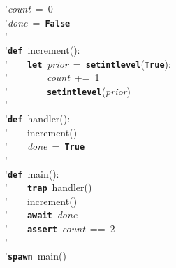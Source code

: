 \'\>\textit{count}~=~0\\

\'\>\textit{done}~=~\texttt{\textbf{False}}\\

\'\>\\

\'\>\texttt{\textbf{def}}~increment():\\

\'\>~~~~\texttt{\textbf{let}}~\textit{prior}~=~\texttt{\textbf{setintlevel}}(\texttt{\textbf{True}}):\\

\'\>~~~~~~~~\textit{count}~+=~1\\

\'\>~~~~~~~~\texttt{\textbf{setintlevel}}(\textit{prior})\\

\'\>\\

\'\>\texttt{\textbf{def}}~handler():\\

\'\>~~~~increment()\\

\'\>~~~~\textit{done}~=~\texttt{\textbf{True}}\\

\'\>\\

\'\>\texttt{\textbf{def}}~main():\\

\'\>~~~~\texttt{\textbf{trap}}~handler()\\

\'\>~~~~increment()\\

\'\>~~~~\texttt{\textbf{await}}~\textit{done}\\

\'\>~~~~\texttt{\textbf{assert}}~\textit{count}~==~2\\

\'\>\\

\'\>\texttt{\textbf{spawn}}~main()